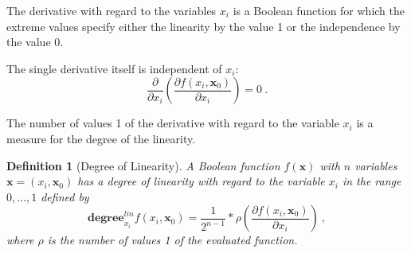 \documentclass[12pt]{toptesi}
\newcommand\bx{\mathbf{x}}
\newtheorem{definition}{Definition}
\begin{document}
The derivative with regard to the variables $x_i$ is a Boolean function for which the extreme values specify either the linearity
by the value 1 or the independence 
by the value 0. 

The single derivative itself is independent of $x_i$:
\begin{equation}
\frac{\partial }{\partial x_i} \left(\frac{\partial f(x_i,\bx_0)}{\partial x_i} \right)= 0~.
\label{equ:sder_indep_xi}
\end{equation}

The number of values 1 of the derivative with regard to the variable $x_i$ is a measure for the degree of the linearity. 

\begin{definition}[Degree of Linearity]
A Boolean function $f(\bx)$ with $n$ variables $\bx = (x_i,\bx_0)$ has a \emph{degree of linearity} with regard to the variable $x_i$ in the range $0,\dots,1$ defined by
\begin{equation}
\mathbf{degree}^{lin}_{x_i}f(x_i,\bx_0) = \frac{1}{2^{n-1}} * \rho\left(\frac{\partial f(x_i,\bx_0)}{\partial x_i} \right)~,
\label{equ:deg_lin_xi}
\end{equation}
where $\rho$ is the number of values 1 of the evaluated function.
\end{definition}
\end{document}
